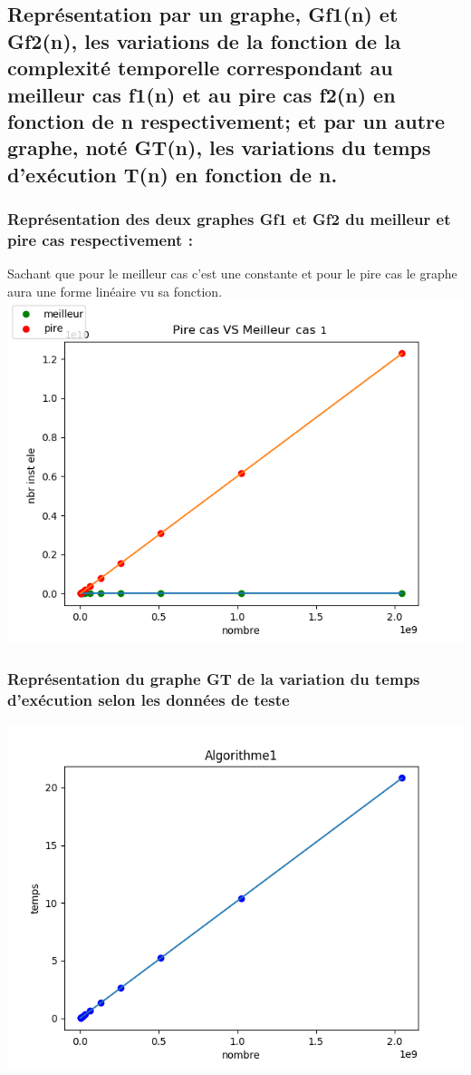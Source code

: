 \documentclass[12pt]{article}
\begin{document}
\subsection{Représentation par un graphe, Gf1(n) et Gf2(n), les variations de la fonction de la complexité temporelle correspondant au meilleur cas f1(n) et au pire cas f2(n) en fonction de n respectivement; et par un autre graphe, noté GT(n), les variations  du temps d'exécution T(n) en fonction de n.}

\subsubsection{Représentation des deux graphes Gf1 et Gf2 du meilleur et pire cas respectivement :}
Sachant que pour le meilleur cas c'est une constante et pour le pire cas le graphe aura une forme linéaire vu sa fonction.
\\
\includegraphics[width=1\textwidth]{graphe/Pire_VS_Meilleur_cas1.png}

\subsubsection{Représentation du graphe GT de la variation du temps d'exécution selon les données de teste}

\includegraphics[width=1\textwidth]{graphe/Algorithme1.png}
\end{document}
